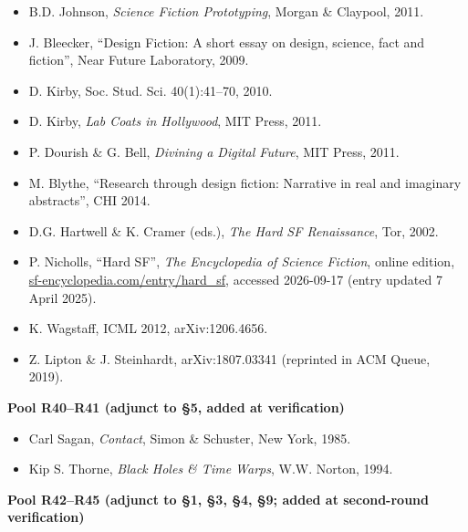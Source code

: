 \documentclass[11pt,a4paper]{article}
\begin{document}
\begin{itemize}[leftmargin=1.6em,itemsep=2pt,parsep=0pt,topsep=3pt]
\item[R30.] B.D. Johnson, \textit{Science Fiction Prototyping}, Morgan \& Claypool, 2011.
\item[R31.] J. Bleecker, ``Design Fiction: A short essay on design, science, fact and fiction'', Near Future Laboratory, 2009.
\item[R32.] D. Kirby, Soc. Stud. Sci. 40(1):41–70, 2010.
\item[R33.] D. Kirby, \textit{Lab Coats in Hollywood}, MIT Press, 2011.
\item[R34.] P. Dourish \& G. Bell, \textit{Divining a Digital Future}, MIT Press, 2011.
\item[R35.] M. Blythe, ``Research through design fiction: Narrative in real and imaginary abstracts'', CHI 2014.
\item[R36.] D.G. Hartwell \& K. Cramer (eds.), \textit{The Hard SF Renaissance}, Tor, 2002.
\item[R37.] P. Nicholls, ``Hard SF'', \textit{The Encyclopedia of Science Fiction}, online edition, \url{sf-encyclopedia.com/entry/hard_sf}, accessed 2026-09-17 (entry updated 7 April 2025).
\item[R38.] K. Wagstaff, ICML 2012, arXiv:1206.4656.
\item[R39.] Z. Lipton \& J. Steinhardt, arXiv:1807.03341 (reprinted in ACM Queue, 2019).
\end{itemize}

\medskip
\noindent\textbf{Pool R40–R41 (adjunct to §5, added at verification)}\par\addvspace{2pt}

\begin{itemize}[leftmargin=1.6em,itemsep=2pt,parsep=0pt,topsep=3pt]
\item[R40.] Carl Sagan, \textit{Contact}, Simon \& Schuster, New York, 1985.
\item[R41.] Kip S. Thorne, \textit{Black Holes \& Time Warps}, W.W. Norton, 1994.
\end{itemize}

\medskip
\noindent\textbf{Pool R42–R45 (adjunct to §1, §3, §4, §9; added at second-round verification)}\par\addvspace{2pt}
\end{document}
